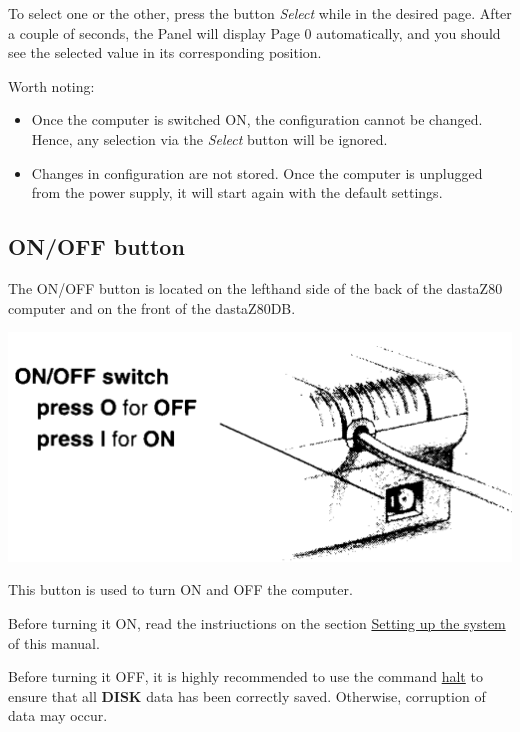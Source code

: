         To select one or the other, press the button \textit{Select} while in
        the desired page. After a couple of seconds, the Panel will display Page
        0 automatically, and you should see the selected value in its
        corresponding position.

        Worth noting:

        \begin{itemize}
            \item Once the computer is switched ON, the configuration cannot be
                changed. Hence, any selection via the \textit{Select} button
                will be ignored.
            \item Changes in configuration are not stored. Once the computer is
                unplugged from the power supply, it will start again with the
                default settings.
        \end{itemize}

    \subsection{ON/OFF button}
    \label{subsec:onoffbutt}

    The ON/OFF button is located on the lefthand side of the back of the
    dastaZ80 computer and on the front of the dastaZ80DB.

    \includegraphics[scale=0.5]{images/onoffbutton.png}

    This button is used to turn ON and OFF the computer.

    Before turning it ON, read the instriuctions on the section
    \hyperref[sec:setting_system]{Setting up the system} of this manual.

    Before turning it OFF, it is highly recommended to use the command 
    \hyperref[cmd:halt]{halt} to ensure that all \textbf{DISK} data has been
    correctly saved. Otherwise, corruption of data may occur.

